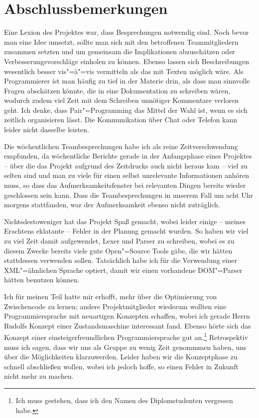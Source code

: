 \documentclass[10pt,a4paper,ngerman,titlepage,tocindentauto]{scrartcl}
\begin{document}
	\section[Abschlussbemerkungen]{\hypertarget{Abschlussbemerkungen}{Abschlussbemerkungen}}
		Eine Lexion des Projektes war, dass Besprechungen notwendig sind. Noch bevor man eine Idee umsetzt, sollte man
		sich mit den betroffenen Teammitgliedern zusammen setzten und um gemeinsam die Implikationen abzuschätzen
		oder Verbesserungsvorschläge einholen zu können. Ebenso lassen sich Beschreibungen wesentlich besser vis"=à"=vis
		vermitteln als das mit Texten möglich wäre. Als Programmierer ist man häufig zu tief in der Materie drin, als dass
		man sinnvolle Fragen abschätzen könnte, die in eine Dokumentation zu schreiben wären, wodurch zudem viel Zeit
		mit dem Schreiben unnötiger Kommentare verloren geht. Ich denke, dass Pair"=Programming das Mittel der Wahl ist,
		wenn es sich zeitlich organisieren lässt. Die Kommunikation über Chat oder Telefon kann leider nicht dasselbe leisten.
		
		Die wöchentlichen Teambesprechungen habe ich als reine Zeitverschwendung empfunden, da wöchentliche
		Berichte gerade in der Anfangsphase eines Projektes -- über die das Projekt aufgrund des Zeitdrucks
		auch nicht heraus kam -- viel zu selten sind und man zu viele für einen selbst unrelevante Informationen
		anhören muss, so dass das Aufmerksamkeitsfenster bei relevanten Dingen bereits wieder geschlossen
		sein kann. Dass die Teambesprechungen in unserem Fall um acht Uhr morgens stattfanden, war der Aufmerksamkeit
		ebenso nicht zuträglich.
		
		Nichtsdestoweniger hat das Projekt Spaß gemacht, wobei leider einige -- meines Erachtens eklatante -- Fehler in
		der Planung gemacht wurden. So haben wir viel zu viel Zeit damit aufgewendet, Lexer und Parser zu schreiben, wobei
		es zu diesem Zwecke bereits viele gute Open"=Source Tools gäbe, die wir hätten stattdessen verwenden sollen.
		Tatsächlich habe ich für die Verwendung einer XML"=ähnlichen Sprache optiert, damit wir einen vorhandene
		DOM"=Parser hätten benutzen können.
		
		Ich für meinen Teil hatte mir erhofft, mehr über die Optimierung von Zwischencode zu lernen; andere Projektmitglieder
		wiederum wollten eine Programmiersprache mit neuartigen Konzepten schaffen, wobei ich gerade Herrn Rudolfs Konzept einer
		Zustandsmaschine interessant fand. Ebenso hörte sich das Konzept einer einsteigerfreundlichen Programmiersprache gut an.\footnote
		{Ich muss gestehen, dass ich den Namen des Diplomstudenten vergessen habe.}
		Retrospektiv muss ich sagen, dass wir uns als Gruppe zu wenig Zeit genommmen haben, uns über die Möglichkeiten
		klarzuwerden. Leider haben wir die Konzeptphase zu schnell abschließen wollen, wobei ich jedoch hoffe, so einen
		Fehler in Zukunft nicht mehr zu machen.
		
\end{document}
